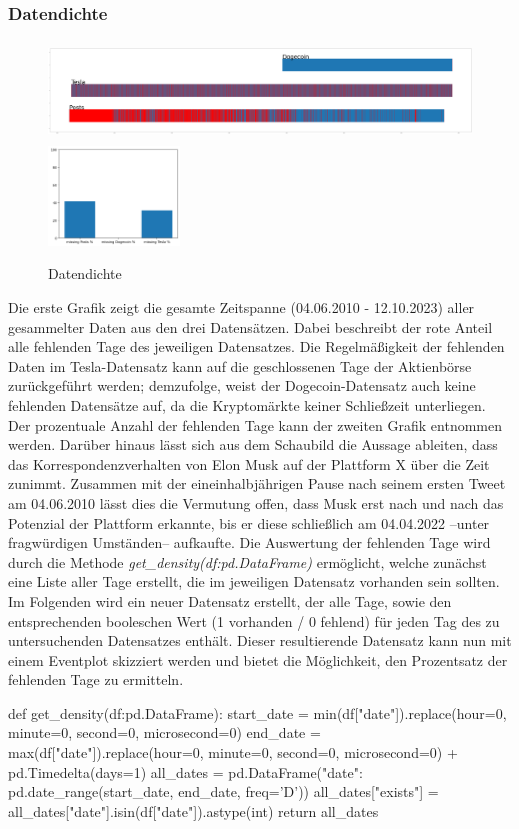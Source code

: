 \documentclass{article}
\begin{document}
\subsubsection{Datendichte}
\begin{figure}[!htb]
  	\includegraphics[width=.7\textwidth, height=100px]{../imgs/Dichte1.png}
	\includegraphics[width=.3\textwidth, height=100px]{../imgs/Dichte2.png}
 	\caption{Datendichte}
 	\label{fig:Datendichte}
\end{figure}
Die erste Grafik zeigt die gesamte Zeitspanne (04.06.2010 - 12.10.2023) aller gesammelter Daten aus den drei Datensätzen.
Dabei beschreibt der rote Anteil alle fehlenden Tage des jeweiligen Datensatzes.
Die Regelmäßigkeit der fehlenden Daten im Tesla-Datensatz kann auf die geschlossenen Tage der Aktienbörse zurückgeführt werden;
demzufolge, weist der Dogecoin-Datensatz auch keine fehlenden Datensätze auf, da die Kryptomärkte keiner Schließzeit unterliegen.
Der prozentuale Anzahl der fehlenden Tage kann der zweiten Grafik entnommen werden.
Darüber hinaus lässt sich aus dem Schaubild die Aussage ableiten, dass das Korrespondenzverhalten von Elon Musk auf der Plattform X über die Zeit zunimmt.
Zusammen mit der eineinhalbjährigen Pause nach seinem ersten Tweet am 04.06.2010 lässt dies die Vermutung offen, dass Musk erst nach und nach das Potenzial der Plattform erkannte, bis er diese schließlich am 04.04.2022 --unter fragwürdigen Umständen-- aufkaufte. 
Die Auswertung der fehlenden Tage wird durch die Methode \textit{get\_density(df:pd.DataFrame)} ermöglicht, welche zunächst eine Liste aller Tage erstellt, die im jeweiligen Datensatz vorhanden sein sollten.
Im Folgenden wird ein neuer Datensatz erstellt, der alle Tage, sowie den entsprechenden booleschen Wert (1 vorhanden / 0 fehlend) für jeden Tag des zu untersuchenden Datensatzes enthält.
Dieser resultierende Datensatz kann nun mit einem Eventplot skizziert werden und bietet die Möglichkeit, den Prozentsatz der fehlenden Tage zu ermitteln.
\begin{python}
def get_density(df:pd.DataFrame):
    start_date = min(df["date"]).replace(hour=0, minute=0, second=0, microsecond=0)
    end_date = max(df["date"]).replace(hour=0, minute=0, second=0, microsecond=0) + pd.Timedelta(days=1)
    all_dates = pd.DataFrame({"date": pd.date_range(start_date, end_date, freq='D')})
    all_dates["exists"] = all_dates["date"].isin(df["date"]).astype(int)
    return all_dates
\end{python}
\end{document}
